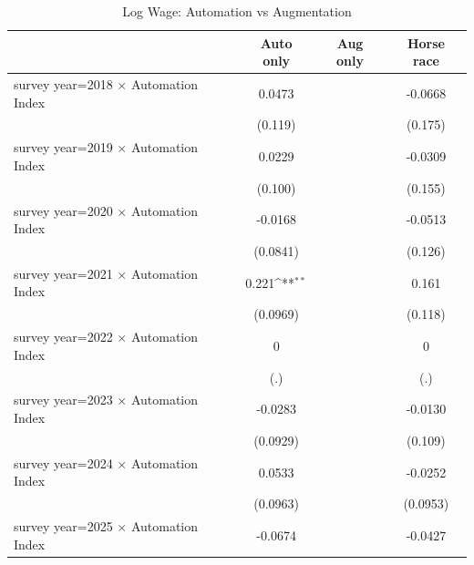 \begin{table}[htbp]\centering
\def\sym#1{\ifmmode^{#1}\else\(^{#1}\)\fi}
\caption{Log Wage: Automation vs Augmentation}
\begin{tabular}{l*{3}{c}}
\toprule
                    &\multicolumn{1}{c}{Auto only}&\multicolumn{1}{c}{Aug only}&\multicolumn{1}{c}{Horse race}\\
\midrule
survey year=2018 $\times$ Automation Index&      0.0473         &                     &     -0.0668         \\
                    &     (0.119)         &                     &     (0.175)         \\
\addlinespace
survey year=2019 $\times$ Automation Index&      0.0229         &                     &     -0.0309         \\
                    &     (0.100)         &                     &     (0.155)         \\
\addlinespace
survey year=2020 $\times$ Automation Index&     -0.0168         &                     &     -0.0513         \\
                    &    (0.0841)         &                     &     (0.126)         \\
\addlinespace
survey year=2021 $\times$ Automation Index&       0.221\sym{**} &                     &       0.161         \\
                    &    (0.0969)         &                     &     (0.118)         \\
\addlinespace
survey year=2022 $\times$ Automation Index&           0         &                     &           0         \\
                    &         (.)         &                     &         (.)         \\
\addlinespace
survey year=2023 $\times$ Automation Index&     -0.0283         &                     &     -0.0130         \\
                    &    (0.0929)         &                     &     (0.109)         \\
\addlinespace
survey year=2024 $\times$ Automation Index&      0.0533         &                     &     -0.0252         \\
                    &    (0.0963)         &                     &    (0.0953)         \\
\addlinespace
survey year=2025 $\times$ Automation Index&     -0.0674         &                     &     -0.0427         \\

\end{tabular}
\end{table}
